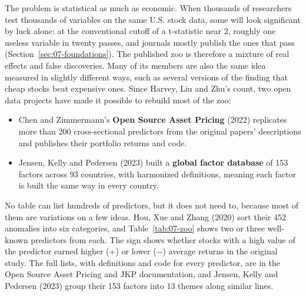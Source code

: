 The problem is statistical as much as economic. When thousands of researchers test thousands of variables on the same U.S. stock data, some will look significant by luck alone: at the conventional cutoff of a t-statistic near 2, roughly one useless variable in twenty passes, and journals mostly publish the ones that pass (Section~\ref{sec:07-foundations}). The published zoo is therefore a mixture of real effects and false discoveries. Many of its members are also the same idea measured in slightly different ways, such as several versions of the finding that cheap stocks beat expensive ones. Since Harvey, Liu and Zhu's count, two open data projects have made it possible to rebuild most of the zoo:

\begin{itemize}
  \item Chen and Zimmermann's \textbf{Open Source Asset Pricing} (2022) replicates more than 200 cross-sectional predictors from the original papers' descriptions and publishes their portfolio returns and code.
  \item Jensen, Kelly and Pedersen (2023) built a \textbf{global factor database} of 153 factors across 93 countries, with harmonized definitions, meaning each factor is built the same way in every country.
\end{itemize}

No table can list hundreds of predictors, but it does not need to, because most of them are variations on a few ideas. Hou, Xue and Zhang (2020) sort their 452 anomalies into six categories, and Table~\ref{tab:07-zoo} shows two or three well-known predictors from each. The sign shows whether stocks with a high value of the predictor earned higher (+) or lower ($-$) average returns in the original study. The full lists, with definitions and code for every predictor, are in the Open Source Asset Pricing and JKP documentation, and Jensen, Kelly and Pedersen (2023) group their 153 factors into 13 themes along similar lines.


